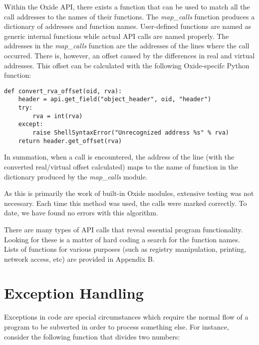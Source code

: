 \documentclass{article}
\begin{document}
Within the Oxide API, there exists a function that can be used to match all the call addresses to the names of their functions.   
The \emph{map\_calls} function produces a dictionary of addresses and function names. User-defined functions are named as generic internal 
functions while actual API calls are named properly.  The addresses in the \emph{map\_calls} function are the addresses of the lines where the
call occurred. There is, however, an offset caused by the differences in real and virtual addresses.  This offset can be calculated with the 
following Oxide-specifc Python function:\\

\begin{algorithm}
\lstset{language=[mips]Assembler}
\begin{lstlisting}
def convert_rva_offset(oid, rva):
    header = api.get_field("object_header", oid, "header")
    try:
        rva = int(rva)
    except:
        raise ShellSyntaxError("Unrecognized address %s" % rva)
    return header.get_offset(rva)
\end{lstlisting}
\end{algorithm}

In summation, when a call is encountered, the address of the line (with the converted real/virtual offset calculated) maps to the name of function
in the dictionary produced by the \emph{map\_calls} module.

As this is primarily the work of built-in Oxide modules, extensive testing was not necessary.  Each time this method was used,
the calls were marked correctly.  To date, we have found no errors with this algorithm.

There are many types of API calls that reveal essential program functionality.  Looking for these is a matter of hard coding a search for the 
function names.  Lists of functions for various purposes (such as registry manipulation, printing, network access, etc) are provided in Appendix B. 

\pagebreak

\section*{Exception Handling}
Exceptions in code are special circumstances which require the normal flow of a program to be subverted in order to process something else.
For instance, consider the following function that divides two numbers: \\
\end{document}
